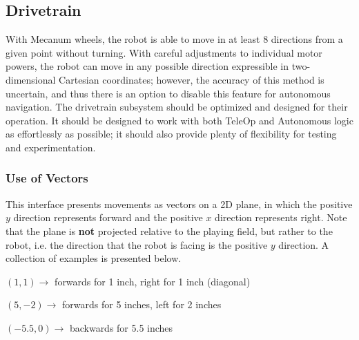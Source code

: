 \documentclass[letterpaper]{article}
\begin{document}
\subsection{Drivetrain}
With Mecanum wheels, the robot is able to move in at least 8 directions from a given point without turning. With careful adjustments to individual motor powers, the robot can move in any possible direction expressible in two-dimensional Cartesian coordinates; however, the accuracy of this method is uncertain, and thus there is an option to disable this feature for autonomous navigation. The drivetrain subsystem should be optimized and designed for their operation. It should be designed to work with both TeleOp and Autonomous logic as effortlessly as possible; it should also provide plenty of flexibility for testing and experimentation.

\subsubsection{Use of Vectors}
This interface presents movements as vectors on a 2D plane, in which the positive $y$ direction represents forward and the positive $x$ direction represents right. Note that the plane is \textbf{not} projected relative to the playing field, but rather to the robot, i.e. the direction that the robot is facing is the positive $y$ direction. A collection of examples is presented below.
\begin{center}
	$(1, 1) \rightarrow$ forwards for 1 inch, right for 1 inch (diagonal)
	
	$(5, -2) \rightarrow$ forwards for 5 inches, left for 2 inches
	
	$(-5.5, 0) \rightarrow$ backwards for 5.5 inches
\end{center}
\end{document}
